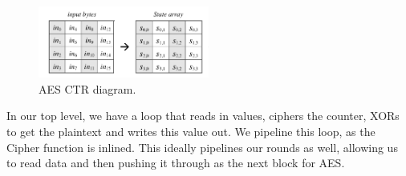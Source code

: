 \begin{figure}[h]
\centering
\includegraphics[width=0.5\textwidth]{aesstate}
\caption{AES CTR diagram.}
\label{fig:aesstate}
\end{figure}

In our top level, we have a loop that reads in values, ciphers the counter, XORs to get the plaintext and writes this value out. We pipeline this loop, as the Cipher function is inlined. This ideally pipelines our rounds as well, allowing us to read data and then pushing it through as the next block for AES.  


